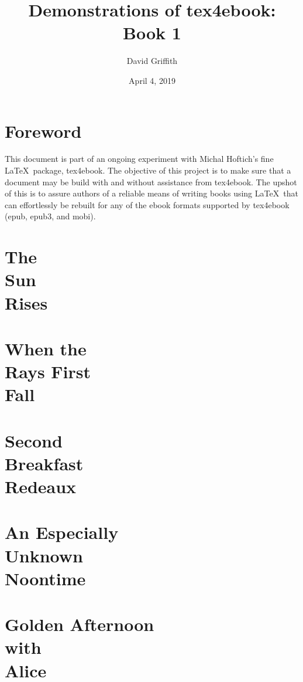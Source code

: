 \documentclass[12pt]{book}
\title{\Huge\textbf{Demonstrations of tex4ebook: Book 1}}
\author{David Griffith}
\date{April 4, 2019}
\begin{document}
\frontmatter
\maketitle
\tableofcontents*

\mainmatter
\parskip=12pt

\chapter*{Foreword}
This document is part of an ongoing experiment with Michal Hoftich's 
fine \LaTeX\ package, tex4ebook.  The objective of this project is to 
make sure that a document may be build with and without assistance from 
tex4ebook.  The upshot of this is to assure authors of a reliable means 
of writing books using \LaTeX\ that can effortlessly be rebuilt for any 
of the ebook formats supported by tex4ebook (epub, epub3, and mobi).

\chapter[The Sun Rises]
{The\\
Sun\\
Rises}
\lipsum[1-20]

\chapter[When the Rays First Fall]
{When the\\
Rays First\\
Fall}
\lipsum[21-40]

\chapter[Second Breakfast Redeaux]
{Second\\
Breakfast\\
Redeaux}
\lipsum[41-60]

\chapter[An Especially Unknown Noontime]
{An Especially\\
Unknown\\
Noontime}
\lipsum[61-80]

\chapter[Golden Afternoon with Alice]
{Golden Afternoon\\
with\\
Alice}
\lipsum[81-100]
\end{document}
